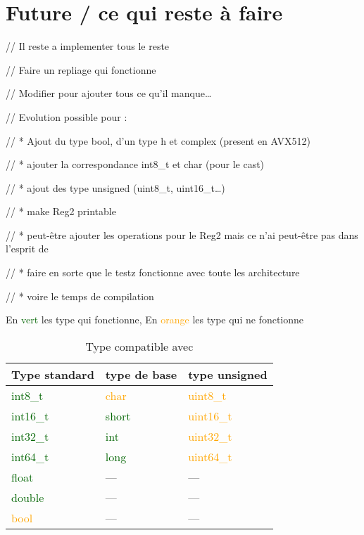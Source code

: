 \section{Future / ce qui reste à faire}

//  Il reste a implementer tous le reste

//  Faire un repliage qui fonctionne

//  Modifier \MIPP pour ajouter tous ce qu'il manque\dots

// Evolution possible pour \MIPP :

// * Ajout du type bool, d'un type h  et complex (present en AVX512)

// * ajouter la correspondance int8_t et char (pour le cast)

// * ajout des type unsigned (uint8_t, uint16_t\dots)

// * make Reg2 printable

// * peut-être ajouter les operations pour le Reg2 mais ce n'ai peut-être pas dans
l'esprit de \MIPP

// * faire en sorte que le testz fonctionne avec toute les architecture

// * voire le temps de compilation

\begin{table}[H]
  \centering
  \caption*{En \textcolor{darkGreen}{vert} les type qui fonctionne, En \textcolor{orange}{orange}
    les type qui ne fonctionne}
  \begin{tabular}[H]{|m{.21\linewidth}|m{.18\linewidth}|m{.21\linewidth}|}
    \hline
    \textbf{Type standard}          & \textbf{type de base}        & \textbf{type unsigned}        \\
    \hline
    \textcolor{darkGreen}{int8_t}  & \textcolor{orange}{char}     & \textcolor{orange}{uint8_t}  \\
    \hline
    \textcolor{darkGreen}{int16_t} & \textcolor{darkGreen}{short} & \textcolor{orange}{uint16_t} \\
    \hline
    \textcolor{darkGreen}{int32_t} & \textcolor{darkGreen}{int}   & \textcolor{orange}{uint32_t} \\
    \hline
    \textcolor{darkGreen}{int64_t} & \textcolor{darkGreen}{long}  & \textcolor{orange}{uint64_t} \\
    \hline
    \textcolor{darkGreen}{float}    & \----                        & \----                         \\
    \hline
    \textcolor{darkGreen}{double}   & \----                        & \----                         \\
    \hline
    \textcolor{orange}{bool}        & \----                        & \----                         \\
    \hline
  \end{tabular}
  \caption{Type compatible avec \MIPP}
\end{table}
